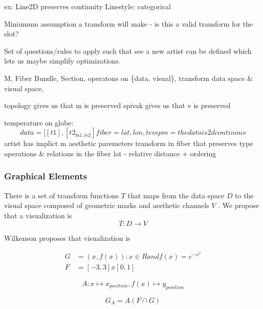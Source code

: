 \documentclass[letterpaper,onecolumn,titlepage]{Ythesis}
\begin{document}
ex: 
Line2D preserves continuity
Linestyle: categorical 


Miniumum assumption a transform will make - is this a valid transform for the slot? 

Set of questions/rules to apply such that see a new artist can be defined which lets us maybe simplify optimizations.  

M, Fiber Bundle, Section, operatons on \{data, visual\}, transform data space \& visual space,  

topology gives us that m is preserved
spivak gives us that v is preserved


temperature on globe:
\begin{equation}
data = [[t1], [t2_{la1, lo2}]
fiber = {lat, lon, temp}
m = the data is 2d continous
\end{equation}
artist has implict m
aesthetic paremeters transform in fiber that preserves type operations \& relations in the fiber
lat - relative distance + ordering 

\subsubsection{Graphical Elements}
There is a set of transform functions $T$ that maps from the data space $D$ to the visual space composed of geometric marks and aesthetic channels $V$ \cite{bertinIIPropertiesGraphic2011, munznerMarksChannels}.  We propose that a visualization is 
\begin{equation}
    T: D \rightarrow V
\end{equation}

Wilkenson proposes  that visualization is  \cite{wilkinsonGrammarGraphics2005, wilkinsonMathematicalFoundationAnalytic2010}

\begin{align}
\label{eq:gog_data_range}
G &= {(x, f(x)): x \in R and f(x)=e^{-x^2}}\\
F &= [-3,3] x [0,1]
\end{align}

\begin{equation}
\label{eq:gog_aesthetic_mapping}
A: x \mapsto x_{position}, f(x) \mapsto y_{position}
\end{equation}

\begin{equation}
G_{A} = A(F \cap G) 
\end{equation}
\end{document}

